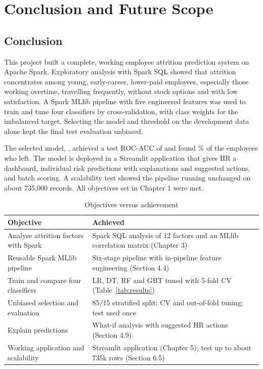 \documentclass[12pt,a4paper]{report}
\begin{document}

\chapter{Conclusion and Future Scope}

\section{Conclusion}

This project built a complete, working employee attrition prediction system on Apache Spark. Exploratory analysis with Spark SQL showed that attrition concentrates among young, early-career, lower-paid employees, especially those working overtime, travelling frequently, without stock options and with low satisfaction. A Spark MLlib pipeline with five engineered features was used to train and tune four classifiers by cross-validation, with class weights for the imbalanced target. Selecting the model and threshold on the development data alone kept the final test evaluation unbiased.

The selected model, \BestModel, achieved a test ROC-AUC of \BestTestAUC{} and found \BestRecall\% of the employees who left. The model is deployed in a Streamlit application that gives HR a dashboard, individual risk predictions with explanations and suggested actions, and batch scoring. A scalability test showed the pipeline running unchanged on about 735,000 records. All objectives set in Chapter 1 were met.

\begin{table}[H]
\centering
\caption{Objectives versus achievement}
\label{tab:obj}
\small
\begin{tabularx}{\textwidth}{|P{6.2cm}|L|}
\hline
\textbf{Objective} & \textbf{Achieved} \\ \hline
Analyse attrition factors with Spark & Spark SQL analysis of 12 factors and an MLlib correlation matrix (Chapter 3) \\ \hline
Reusable Spark MLlib pipeline & Six-stage pipeline with in-pipeline feature engineering (Section 4.4) \\ \hline
Train and compare four classifiers & LR, DT, RF and GBT tuned with 5-fold CV (Table~\ref{tab:results}) \\ \hline
Unbiased selection and evaluation & 85/15 stratified split; CV and out-of-fold tuning; test used once \\ \hline
Explain predictions & What-if analysis with suggested HR actions (Section 4.9) \\ \hline
Working application and scalability & Streamlit application (Chapter 5); test up to about 735k rows (Section 6.5) \\ \hline
\end{tabularx}
\end{table}
\end{document}
